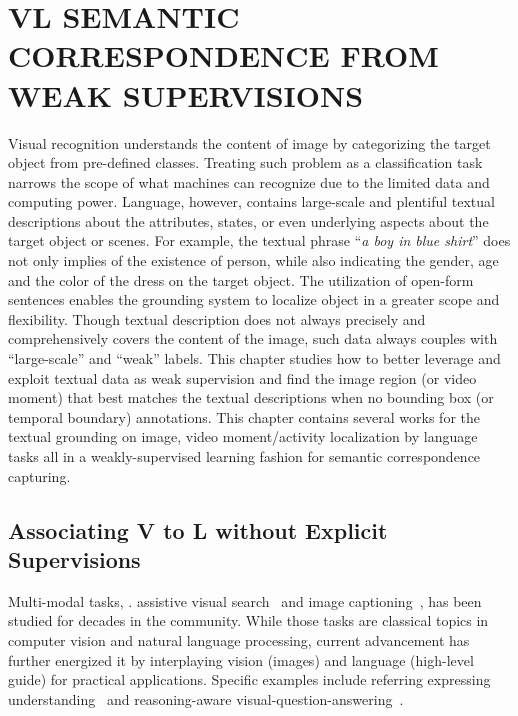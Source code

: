 \chapter{VL SEMANTIC CORRESPONDENCE FROM WEAK SUPERVISIONS}


Visual recognition understands the content of image by categorizing the target object from pre-defined classes. Treating such problem as a classification task narrows the scope of what machines can recognize due to the limited data and computing power.
Language, however, contains large-scale and plentiful textual descriptions about the attributes, states, or even underlying aspects about the target object or scenes. For example, the textual phrase ``\textit{a boy in blue shirt}'' does not only implies of the existence of person, while also indicating the gender, age and the color of the dress on the target object. The utilization of open-form sentences enables the grounding system to localize object in a greater scope and flexibility. 
Though textual description does not always precisely and comprehensively covers the content of the image, such data always couples with ``large-scale'' and ``weak'' labels. This chapter studies how to better leverage and exploit textual data as weak supervision and find the image region (or video moment) that best matches the textual descriptions when no bounding box (or temporal boundary) annotations.
This chapter contains several works for the textual grounding on image, video moment/activity localization by language tasks all in a weakly-supervised learning fashion for semantic correspondence capturing.

\section{Associating V to L without Explicit Supervisions}
Multi-modal tasks, \eg. assistive visual search~\citep{cai2004hierarchical, la1998combining}  and image captioning~\citep{you2016image, vinyals2017show}, has been studied for decades in the community. While those tasks are classical topics in computer vision and natural language processing,
current advancement has further energized it by interplaying
vision (images) and language (high-level guide) for practical applications. Specific examples include referring expressing understanding~\citep{nagaraja2016modeling,hu2017modeling} and reasoning-aware visual-question-answering~\citep{hu2017learning}.

